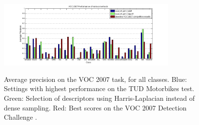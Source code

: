 \begin{figure}[hbt]
    \centering
    \includegraphics[width=0.8\textwidth]{VOC_aps}
    \label{fig:voclocalaps}
    \caption{Average precision on the VOC 2007 task, for all classes. Blue: Settings with highest performance on the TUD Motorbikes test. Green: Selection of descriptors using Harris-Laplacian instead of dense sampling. Red: Best scores on the VOC 2007 Detection Challenge \cite{pascal-voc-2007}.}
\end{figure}

